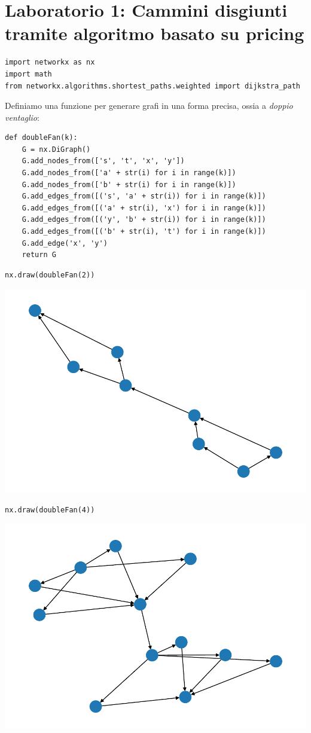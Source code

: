 \chapter{Laboratorio 1: Cammini disgiunti tramite algoritmo basato su pricing}


\begin{verbatim}
import networkx as nx
import math
from networkx.algorithms.shortest_paths.weighted import dijkstra_path
\end{verbatim}


Definiamo una funzione per generare grafi in una  forma precisa, ossia a 
\textit{doppio ventaglio}: 

\begin{verbatim}
def doubleFan(k):
    G = nx.DiGraph()
    G.add_nodes_from(['s', 't', 'x', 'y'])
    G.add_nodes_from(['a' + str(i) for i in range(k)])
    G.add_nodes_from(['b' + str(i) for i in range(k)])
    G.add_edges_from([('s', 'a' + str(i)) for i in range(k)])
    G.add_edges_from([('a' + str(i), 'x') for i in range(k)])
    G.add_edges_from([('y', 'b' + str(i)) for i in range(k)])
    G.add_edges_from([('b' + str(i), 't') for i in range(k)])
    G.add_edge('x', 'y')
    return G
\end{verbatim}

\begin{verbatim}
nx.draw(doubleFan(2))
\end{verbatim}
\includegraphics[width=0.3 \linewidth]{labs/figures/lab1_figure3_1.pdf}


\begin{verbatim}
nx.draw(doubleFan(4))
\end{verbatim}
\includegraphics[width=0.3 \linewidth]{labs/figures/lab1_figure4_1.pdf}



